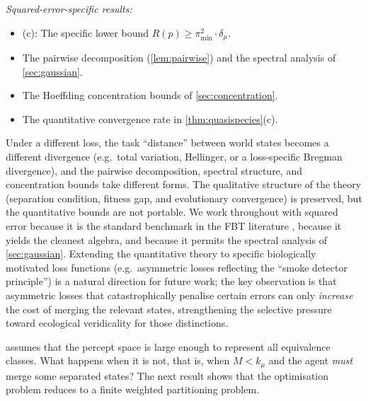 \documentclass[12pt]{article}
\newcommand{\dmu}{\delta_\mu}
\newcommand{\kmu}{k_\mu}
\newcommand{\pimin}{\pi_{\min}}
\begin{document}
\emph{Squared-error-specific results:}
\begin{itemize}
\item {}(c): The specific lower bound $R(p) \ge \pimin^2 \cdot \dmu$.
\item The pairwise decomposition (\cref{lem:pairwise}) and the spectral analysis of \cref{sec:gaussian}.
\item The Hoeffding concentration bounds of \cref{sec:concentration}.
\item The quantitative convergence rate in \cref{thm:quasispecies}(c).
\end{itemize}

Under a different loss, the task ``distance'' between world states becomes a different divergence (e.g.\ total variation, Hellinger, or a loss-specific Bregman divergence), and the pairwise decomposition, spectral structure, and concentration bounds take different forms. The qualitative structure of the theory (separation condition, fitness gap, and evolutionary convergence) is preserved, but the quantitative bounds are not portable. We work throughout with squared error because it is the standard benchmark in the FBT literature \citep{hoffman_etal_2015,prakash_etal_2021}, because it yields the cleanest algebra, and because it permits the spectral analysis of \cref{sec:gaussian}. Extending the quantitative theory to specific biologically motivated loss functions (e.g.\ asymmetric losses reflecting the ``smoke detector principle'') is a natural direction for future work; the key observation is that asymmetric losses that catastrophically penalise certain errors can only \emph{increase} the cost of merging the relevant states, strengthening the selective pressure toward ecological veridicality for those distinctions.

 assumes that the percept space is large enough to represent all equivalence classes. What happens when it is not, that is, when $M < \kmu$ and the agent \emph{must} merge some separated states? The next result shows that the optimisation problem reduces to a finite weighted partitioning problem.
\end{document}
